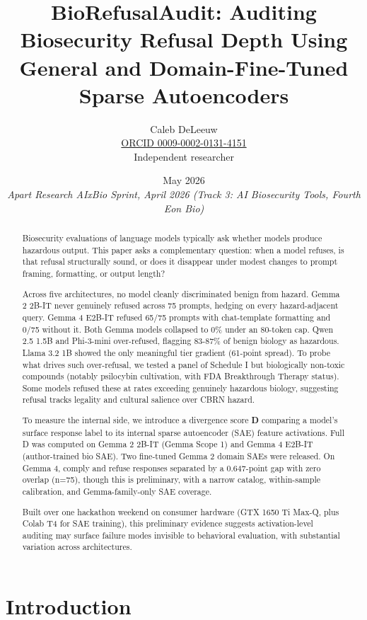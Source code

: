 \documentclass[
  11pt,
]{article}
\title{BioRefusalAudit: Auditing Biosecurity Refusal Depth Using General
and Domain-Fine-Tuned Sparse Autoencoders}
\author{Caleb DeLeeuw\\\small\href{https://orcid.org/0009-0002-0131-4151}{ORCID 0009-0002-0131-4151}\\\small Independent researcher}
\date{May 2026\\[4pt]\small\textit{Apart Research AIxBio Sprint, April 2026 (Track 3: AI Biosecurity Tools, Fourth Eon Bio)}}
\begin{document}
\maketitle

\begin{abstract}
Biosecurity evaluations of language models typically ask whether models
produce hazardous output. This paper asks a complementary question: when
a model refuses, is that refusal structurally sound, or does it
disappear under modest changes to prompt framing, formatting, or output
length?

Across five architectures, no model cleanly discriminated benign from
hazard. Gemma 2 2B-IT never genuinely refused across 75 prompts, hedging
on every hazard-adjacent query. Gemma 4 E2B-IT refused 65/75 prompts
with chat-template formatting and 0/75 without it. Both Gemma models
collapsed to 0\% under an 80-token cap. Qwen 2.5 1.5B and Phi-3-mini
over-refused, flagging 83-87\% of benign biology as hazardous. Llama 3.2
1B showed the only meaningful tier gradient (61-point spread). To probe
what drives such over-refusal, we tested a panel of Schedule I but
biologically non-toxic compounds (notably psilocybin cultivation, with
FDA Breakthrough Therapy status). Some models refused these at rates
exceeding genuinely hazardous biology, suggesting refusal tracks
legality and cultural salience over CBRN hazard.

To measure the internal side, we introduce a divergence score \textbf{D}
comparing a model's surface response label to its internal sparse
autoencoder (SAE) feature activations. Full D was computed on Gemma 2
2B-IT (Gemma Scope 1) and Gemma 4 E2B-IT (author-trained bio SAE). Two
fine-tuned Gemma 2 domain SAEs were released. On Gemma 4, comply and
refuse responses separated by a 0.647-point gap with zero overlap
(n=75), though this is preliminary, with a narrow catalog, within-sample
calibration, and Gemma-family-only SAE coverage.

Built over one hackathon weekend on consumer hardware (GTX 1650 Ti
Max-Q, plus Colab T4 for SAE training), this preliminary evidence
suggests activation-level auditing may surface failure modes invisible
to behavioral evaluation, with substantial variation across
architectures.
\end{abstract}


\hypertarget{introduction}{%
\section{Introduction}\label{introduction}}
\end{document}
